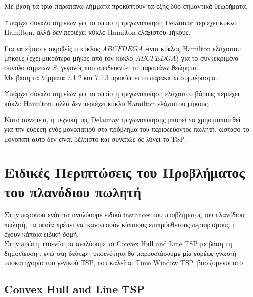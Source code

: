 \documentclass[oneside,12pt]{book}
\theoremstyle{definition}
\begin{document}
Με βάση τα τρία παραπάνω λήμματα προκύπτουν τα εξής δύο σημαντικά θεωρήματα. \\

\begin{mytheorem}{}{}
	Υπάρχει σύνολο σημείων για το οποίο η τριγωνοποίηση Delaunay περιέχει κύκλο Hamilton, αλλά δεν περιέχει κύκλο Hamilton ελάχιστου μήκους.
\end{mytheorem}

Για να είμαστε ακριβείς ο κύκλος \(ABCFDEGA\) είναι κύκλος Hamilton ελάχιστου μήκους (έχει μικρότερο μήκος από τον κύκλο \(ABCFEDGA\)) για το συγκεκριμένο σύνολο σημείων \(S\), γεγονός που αποδεικνύει το παραπάνω θεώρημα. \\

Με βάση τα λήμματα 7.1.2 και 7.1.3 προκύπτει το παρακάτω συμπέρασμα. \\

\begin{mytheorem}{}{}
	Υπάρχει σύνολο σημείων για το οποίο η τριγωνοποίηση ελάχιστου βάρους περιέχει κύκλο Hamilton, αλλά δεν περιέχει κύκλο Hamilton ελάχιστου μήκους.
\end{mytheorem}

Κατά συνέπεια, η τεχνική της Delaunay τριγωνοποίησης μπορεί να χρησιμοποιηθεί για την εύρεση ενός μονοπατιού στο πρόβλημα του περιοδεύοντος πωλητή, ωστόσο το μονοπάτι αυτό δεν είναι βέλτιστο και συνεπώς δε λύνει το TSP. \\

\chapter{Ειδικές Περιπτώσεις του Προβλήματος του πλανόδιου πωλητή}

Στην παρούσα ενότητα αναλύουμε ειδικά instances του προβλήματος του πλανόδιου πωλητή, τα οποία πρέπει να ικανοποιούν κάποιους επιπρόσθετους περιορισμούς ή έχουν κάποια ειδική δομή. \\

Στην πρώτη υποενότητα αναλύουμε το Convex Hull and Line TSP με βάση τη δημοσίευση \cite{17}, ενώ στη δεύτερη υποενότητα θα παρουσιάσουμε μία ευρέως γνωστή υποκατηγορία του γενικού TSP, που καλείται Time Window TSP, βασιζόμενοι στο \cite{1}. \\

\section{Convex Hull and Line TSP}
\end{document}
